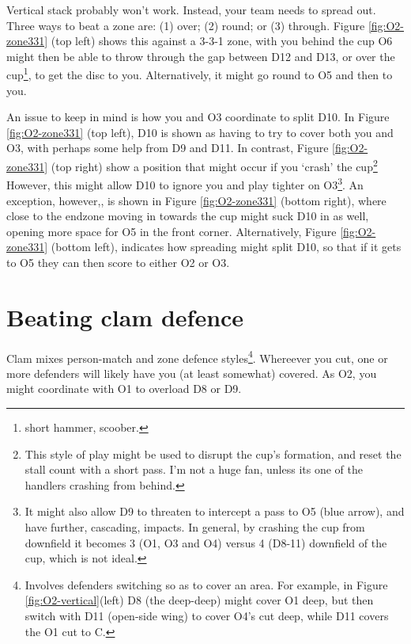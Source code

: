 \documentclass{tufte-handout}
\begin{document}
Vertical stack 
probably won't work. 
Instead, your 
team needs to 
spread out. 
Three ways to beat a zone are:
(1) over;
(2) round; or
(3) through. 
Figure \ref{fig:O2-zone331}
(top left)
shows this 
against a 
3-3-1 zone, 
with you 
behind the cup  
O6 might then
be able to throw 
through 
the gap between 
D12 
and D13, or 
over the cup\footnote{
short hammer, scoober.}, 
to get the disc to you. 
Alternatively, 
it might go round to 
O5 and then to you.

An issue 
to keep in mind 
is how you and O3
coordinate to split 
D10. 
In Figure \ref{fig:O2-zone331}
(top left), 
D10 is shown as having to 
try to cover both 
you and O3, 
with perhaps some help 
from D9 
and D11. 
In contrast, 
Figure \ref{fig:O2-zone331}
(top right) 
show a position 
that might occur 
if you `crash' 
the cup\footnote{ 
This style of play 
might be used 
to disrupt the 
cup's formation, and 
reset the stall count 
with a short pass. 
I'm not a huge fan, 
unless its one of the handlers 
crashing from behind.}
However, 
this might allow D10 
to ignore you 
and play 
tighter on O3\footnote{ 
It might also allow 
D9 to threaten to intercept 
a pass to O5 
(blue arrow), 
and have further,
cascading, 
impacts. 
In general, 
by crashing the cup
from downfield 
it becomes 3 (O1, O3 and O4) 
versus 4 (D8-11) 
downfield of the cup, 
which is not ideal.}. 
An exception, 
however,,
is shown in 
Figure \ref{fig:O2-zone331}
(bottom right), 
where close to the endzone 
moving in towards 
the cup 
might suck D10 
in as well, 
opening more space for O5 
in the front corner.  
Alternatively, 
Figure \ref{fig:O2-zone331}
(bottom left), 
indicates how spreading 
might split D10, 
so that if it gets to 
O5 
they can then score to 
either O2 
or O3. 


\section{Beating clam defence}\label{sec:zone}
Clam mixes person-match 
and zone defence styles\footnote{
Involves defenders 
switching 
so as to cover 
an area. 
For example, 
in Figure \ref{fig:O2-vertical}(left) 
D8 
(the deep-deep) 
might cover 
O1 deep, 
but then switch with D11 
(open-side wing)
to cover O4's cut deep, 
while D11 covers 
the O1 
cut to C.}.
Whereever you cut, 
one or more defenders
will likely have you
(at least somewhat) covered. 
As O2, 
you might
coordinate 
with O1
to overload
D8 or D9.
\end{document}
